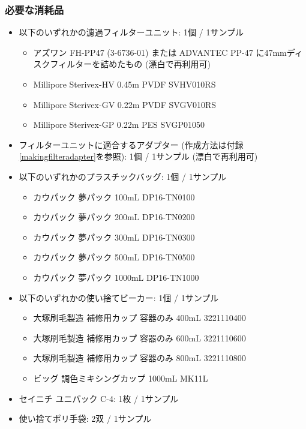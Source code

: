 \documentclass[titlepage,10pt,a4paper,uplatex]{jsbook}
\begin{document}
\subsubsection{必要な消耗品}
\begin{itemize}
\item 以下のいずれかの濾過フィルターユニット: 1個 / 1サンプル
\begin{itemize}
\item アズワン FH-PP47 (3-6736-01) または ADVANTEC PP-47 に47mmディスクフィルターを詰めたもの (漂白で再利用可)
\item Millipore Sterivex-HV 0.45{\textmu}m PVDF SVHV010RS
\item Millipore Sterivex-GV 0.22{\textmu}m PVDF SVGV010RS
\item Millipore Sterivex-GP 0.22{\textmu}m PES SVGP01050
\end{itemize}
\item フィルターユニットに適合するアダプター (作成方法は付録\ref{makingfilteradapter}を参照): 1個 / 1サンプル (漂白で再利用可)
\item 以下のいずれかのプラスチックバッグ: 1個 / 1サンプル
\begin{itemize}
\item カウパック 夢パック 100mL DP16-TN0100
\item カウパック 夢パック 200mL DP16-TN0200
\item カウパック 夢パック 300mL DP16-TN0300
\item カウパック 夢パック 500mL DP16-TN0500
\item カウパック 夢パック 1000mL DP16-TN1000
\end{itemize}
\item 以下のいずれかの使い捨てビーカー: 1個 / 1サンプル
\begin{itemize}
\item 大塚刷毛製造 補修用カップ 容器のみ 400mL 3221110400
\item 大塚刷毛製造 補修用カップ 容器のみ 600mL 3221110600
\item 大塚刷毛製造 補修用カップ 容器のみ 800mL 3221110800
\item ビッグ 調色ミキシングカップ 1000mL MK11L
\end{itemize}
\item セイニチ ユニパック C-4: 1枚 / 1サンプル
\item 使い捨てポリ手袋: 2双 / 1サンプル
\end{itemize}
\end{document}

